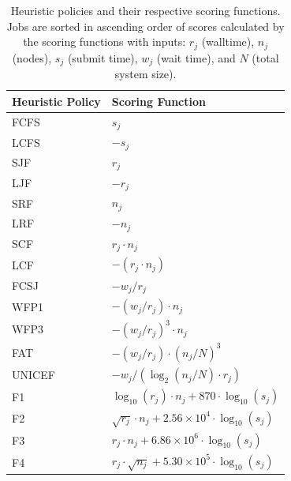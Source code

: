 \documentclass[conference]{IEEEtran}
\begin{document}

\begin{table}[ht]
\centering
\small
\setlength{\tabcolsep}{6pt} %
\begin{tabular}{ll}
\toprule
\textbf{Heuristic Policy} & \textbf{Scoring Function} \\
\midrule
FCFS & $s_j$ \\
LCFS & $-s_j$ \\
SJF  & $r_j$ \\
LJF  & $-r_j$ \\
SRF  & $n_j$ \\
LRF  & $-n_j$ \\
SCF  & $r_j \cdot n_j$ \\
LCF  & $-(r_j \cdot n_j)$ \\
FCSJ & $-w_j / r_j$ \\
WFP1 & $-(w_j / r_j) \cdot n_j$ \\
WFP3 & $-(w_j / r_j)^3 \cdot n_j$ \\
FAT  & $-(w_j / r_j) \cdot (n_j / N)^3$ \\
UNICEF & $-w_j / (\log_2(n_j / N) \cdot r_j)$ \\
F1   & $\log_{10}(r_j) \cdot n_j + 870 \cdot \log_{10}(s_j)$ \\
F2   & $\sqrt{r_j} \cdot n_j + 2.56 \times 10^4 \cdot \log_{10}(s_j)$ \\
F3   & $r_j \cdot n_j + 6.86 \times 10^6 \cdot \log_{10}(s_j)$ \\
F4   & $r_j \cdot \sqrt{n_j} + 5.30 \times 10^5 \cdot \log_{10}(s_j)$ \\
\bottomrule
\end{tabular}
\caption{Heuristic policies and their respective scoring functions. Jobs are sorted in ascending order of scores calculated by the scoring functions with inputs: $r_j$ (walltime), $n_j$ (nodes), $s_j$ (submit time), $w_j$ (wait time), and $N$ (total system size).}
\label{tab:heuristics-policies}
\end{table}
\end{document}
